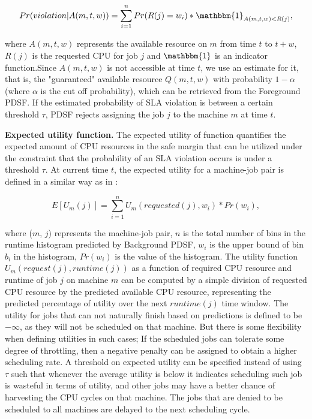 \documentclass[sigplan,10pt,review,anonymous]{acmart}
\begin{document}
\begin{equation}
    Pr(violation|A(m,t,w)) = \sum_{i = 1}^{n} Pr(R(j) = w_i) * \mathbbm{1}_{A(m,t,w) < R(j)},
\end{equation}

where $A(m,t,w)$ represents the available resource on $m$ from time $t$ to $t+w$, $R(j)$ is the requested CPU for job $j$ and $\mathbbm{1}$ is an indicator function.Since $A(m, t, w)$ is not accessible at time $t$, we use an estimate for it, that is, the "guaranteed" available resource $Q(m, t, w)$ with probability $1 - \alpha$ (where $\alpha$ is the cut off probability), which can be retrieved from the Foreground PDSF. If the estimated probability of SLA violation is between a certain threshold $\tau$, PDSF rejects assigning the job $j$ to the machine $m$ at time $t$.

\textbf{Expected utility function.} The expected utility of function quantifies the expected amount of CPU resources in the safe margin that can be utilized under the constraint that the probability of an SLA violation occurs is under a threshold $\tau$. At current time $t$, the expected utility for a machine-job pair is defined in a similar way as in \cite{10.1145/3190508.3190515}:

\begin{equation}
    E[U_m(j)] = \sum_{i = 1}^{n} U_m(requested(j), w_i) * Pr(w_i),
\end{equation}

where ($m$, $j$) represents the machine-job pair, $n$ is the total number of bins in the runtime histogram predicted by Background PDSF, $w_i$ is the upper bound of bin $b_i$ in the histogram, $Pr(w_i)$ is the value of the histogram. The utility function $U_m(request(j), runtime(j))$ as a function of required CPU resource and runtime of job $j$ on machine $m$ can be computed by a simple division of requested CPU resource by the predicted available CPU resource, representing the predicted percentage of utility over the next $runtime(j)$ time window. The utility for jobs that can not naturally finish based on predictions is defined to be $-\infty$, as they will not be scheduled on that machine. But there is some flexibility when defining utilities in such cases; If the scheduled jobs can tolerate some degree of throttling, then a negative penalty can be assigned to obtain a higher scheduling rate. A threshold on expected utility can be specified instead of using $\tau$ such that whenever the average utility is below it indicates scheduling such job is wasteful in terms of utility, and other jobs may have a better chance of harvesting the CPU cycles on that machine. The jobs that are denied to be scheduled to all machines are delayed to the next scheduling cycle.
\end{document}
